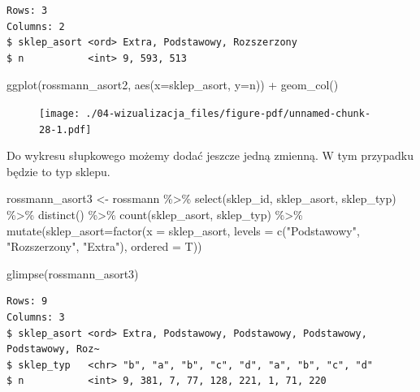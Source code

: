 \documentclass[
  letterpaper,
  DIV=11,
  numbers=noendperiod]{scrreprt}
\newenvironment{Shaded}{\begin{snugshade}}{\end{snugshade}}
\newcommand{\AttributeTok}[1]{\textcolor[rgb]{0.40,0.45,0.13}{#1}}
\newcommand{\FunctionTok}[1]{\textcolor[rgb]{0.28,0.35,0.67}{#1}}
\newcommand{\NormalTok}[1]{\textcolor[rgb]{0.00,0.23,0.31}{#1}}
\newcommand{\OtherTok}[1]{\textcolor[rgb]{0.00,0.23,0.31}{#1}}
\newcommand{\SpecialCharTok}[1]{\textcolor[rgb]{0.37,0.37,0.37}{#1}}
\newcommand{\StringTok}[1]{\textcolor[rgb]{0.13,0.47,0.30}{#1}}
\begin{document}
\begin{verbatim}
Rows: 3
Columns: 2
$ sklep_asort <ord> Extra, Podstawowy, Rozszerzony
$ n           <int> 9, 593, 513
\end{verbatim}

\begin{Shaded}
\begin{Highlighting}[]
\FunctionTok{ggplot}\NormalTok{(rossmann\_asort2, }\FunctionTok{aes}\NormalTok{(}\AttributeTok{x=}\NormalTok{sklep\_asort, }\AttributeTok{y=}\NormalTok{n)) }\SpecialCharTok{+}
  \FunctionTok{geom\_col}\NormalTok{()}
\end{Highlighting}
\end{Shaded}

\begin{figure}[H]

{\centering \texttt{[image: ./04-wizualizacja\_files/figure-pdf/unnamed-chunk-28-1.pdf]}

}

\end{figure}

Do wykresu słupkowego możemy dodać jeszcze jedną zmienną. W tym
przypadku będzie to typ sklepu.

\begin{Shaded}
\begin{Highlighting}[]
\NormalTok{rossmann\_asort3 }\OtherTok{\textless{}{-}}\NormalTok{ rossmann }\SpecialCharTok{\%\textgreater{}\%}
  \FunctionTok{select}\NormalTok{(sklep\_id, sklep\_asort, sklep\_typ) }\SpecialCharTok{\%\textgreater{}\%}
  \FunctionTok{distinct}\NormalTok{() }\SpecialCharTok{\%\textgreater{}\%}
  \FunctionTok{count}\NormalTok{(sklep\_asort, sklep\_typ) }\SpecialCharTok{\%\textgreater{}\%}
  \FunctionTok{mutate}\NormalTok{(}\AttributeTok{sklep\_asort=}\FunctionTok{factor}\NormalTok{(}\AttributeTok{x =}\NormalTok{ sklep\_asort,}
                            \AttributeTok{levels =} \FunctionTok{c}\NormalTok{(}\StringTok{"Podstawowy"}\NormalTok{, }
                                       \StringTok{"Rozszerzony"}\NormalTok{, }
                                       \StringTok{"Extra"}\NormalTok{), }
                            \AttributeTok{ordered =}\NormalTok{ T))}

\FunctionTok{glimpse}\NormalTok{(rossmann\_asort3)}
\end{Highlighting}
\end{Shaded}

\begin{verbatim}
Rows: 9
Columns: 3
$ sklep_asort <ord> Extra, Podstawowy, Podstawowy, Podstawowy, Podstawowy, Roz~
$ sklep_typ   <chr> "b", "a", "b", "c", "d", "a", "b", "c", "d"
$ n           <int> 9, 381, 7, 77, 128, 221, 1, 71, 220
\end{verbatim}
\end{document}

